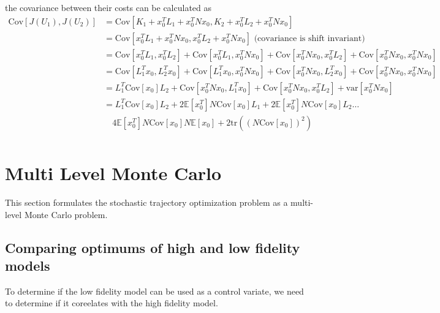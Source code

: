 \documentclass{article}
\begin{document}
the covariance between their costs can be calculated as
\begin{equation}
  \begin{aligned}
    \text{Cov}[J(U_1), J(U_2)] &= \text{Cov}[K_1 + x_0^T L_1 + x_0^T N x_0, K_2 + x_0^T L_2 + x_0^T N x_0] \\
    &= \text{Cov}[x_0^T L_1 + x_0^T N x_0, x_0^T L_2 + x_0^T N x_0] \text{ (covariance is shift invariant)} \\
    &= \text{Cov}[x_0^T L_1, x_0^T L_2] + \text{Cov}[x_0^T L_1, x_0^T N x_0] + \text{Cov}[x_0^T N x_0, x_0^T L_2] + \text{Cov}[x_0^T N x_0, x_0^T N x_0] \\
    &= \text{Cov}[ L_1^T x_0, L_2^T x_0] + \text{Cov}[L_1^T x_0, x_0^T N x_0] + \text{Cov}[x_0^T N x_0, L_2^T x_0] + \text{Cov}[x_0^T N x_0, x_0^T N x_0] \\
    &= L_1^T \text{Cov}[x_0] L_2 + \text{Cov}[x_0^T N x_0, L_1^T x_0] + \text{Cov}[x_0^T N x_0, x_0^T L_2] + \text{var}[x_0^T N x_0] \\
    &= L_1^T \text{Cov}[x_0] L_2 + 2\mathbb{E}[x_0^T] N \text{Cov}[x_0] L_1 + 2\mathbb{E}[x_0^T] N \text{Cov}[x_0] L_2 \hdots \\
    & \quad 4 \mathbb{E}[x_0^T]N\text{Cov}[x_0]N\mathbb{E}[x_0] + 2\text{tr}((N \text{Cov}[x_0])^2) \\
  \end{aligned}
\end{equation}

\section{Multi Level Monte Carlo}

This section formulates the stochastic trajectory optimization problem as a multi-level Monte Carlo problem.

\subsection{Comparing optimums of high and low fidelity models} \label{comp_opt}

To determine if the low fidelity model can be used as a control variate, we need to determine if it coreelates with the high fidelity model.
\end{document}
